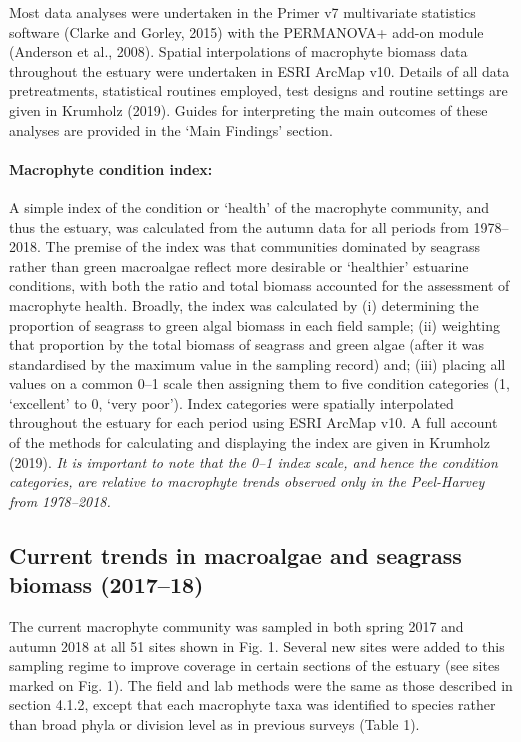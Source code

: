 \documentclass[
]{book}
\begin{document}
Most data analyses were undertaken in the Primer v7 multivariate statistics software (Clarke and Gorley, 2015) with the PERMANOVA+ add-on module (Anderson et al., 2008). Spatial interpolations of macrophyte biomass data throughout the estuary were undertaken in ESRI ArcMap v10. Details of all data pretreatments, statistical routines employed, test designs and routine settings are given in Krumholz (2019). Guides for interpreting the main outcomes of these analyses are provided in the `Main Findings' section.

\hypertarget{macrophyte-condition-index}{%
\paragraph{Macrophyte condition index:}\label{macrophyte-condition-index}}

A simple index of the condition or `health' of the macrophyte community, and thus the estuary, was calculated from the autumn data for all periods from 1978--2018. The premise of the index was that communities dominated by seagrass rather than green macroalgae reflect more desirable or `healthier' estuarine conditions, with both the ratio and total biomass accounted for the assessment of macrophyte health. Broadly, the index was calculated by (i) determining the proportion of seagrass to green algal biomass in each field sample; (ii) weighting that proportion by the total biomass of seagrass and green algae (after it was standardised by the maximum value in the sampling record) and; (iii) placing all values on a common 0--1 scale then assigning them to five condition categories (1, `excellent' to 0, `very poor'). Index categories were spatially interpolated throughout the estuary for each period using ESRI ArcMap v10. A full account of the methods for calculating and displaying the index are given in Krumholz (2019). \emph{It is important to note that the 0--1 index scale, and hence the condition categories, are relative to macrophyte trends observed only in the Peel-Harvey from 1978--2018.}

\hypertarget{current-trends-in-macroalgae-and-seagrass-biomass-201718}{%
\subsection{Current trends in macroalgae and seagrass biomass (2017--18)}\label{current-trends-in-macroalgae-and-seagrass-biomass-201718}}

The current macrophyte community was sampled in both spring 2017 and autumn 2018 at all 51 sites shown in Fig. 1. Several new sites were added to this sampling regime to improve coverage in certain sections of the estuary (see sites marked on Fig. 1). The field and lab methods were the same as those described in section 4.1.2, except that each macrophyte taxa was identified to species rather than broad phyla or division level as in previous surveys (Table 1).
\end{document}
